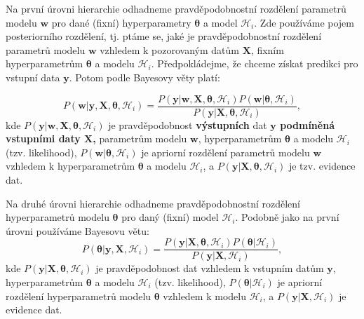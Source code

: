 Na první úrovni hierarchie odhadneme pravděpodobnostní rozdělení parametrů modelu $\mathbf{w}$ pro dané (fixní) hyperparametry $\boldsymbol{\theta}$ a model $\mathcal{H}_i$.
Zde používáme pojem posteriorního rozdělení, tj. ptáme se, jaké je pravděpodobnostní rozdělení parametrů modelu $\mathbf{w}$ vzhledem k pozorovaným datům $\mathbf{X}$, fixním hyperparametrům $\boldsymbol{\theta}$ a modelu $\mathcal{H}_i$.
Předpokládejme, že chceme získat predikci pro vstupní data $\mathbf{y}$.
Potom podle Bayesovy věty platí:

\begin{equation}
  P(\mathbf{w} | \mathbf{y}, \mathbf{X}, \boldsymbol{\theta}, \mathcal{H}_i) = \frac{P( \mathbf{y} | \mathbf{w}, \mathbf{X}, \boldsymbol{\theta}, \mathcal{H}_i) P(\mathbf{w} | \boldsymbol{\theta}, \mathcal{H}_i)}{P(\mathbf{y} |\mathbf{X}, \boldsymbol{\theta}, \mathcal{H}_i)},     
\end{equation}
kde $P( \mathbf{y} | \mathbf{w}, \mathbf{X}, \boldsymbol{\theta}, \mathcal{H}_i)$ je pravděpodobnost \textbf{výstupních} dat \textbf{$\mathbf{y}$ podmíněná vstupními daty $\mathbf{X}$,} parametrům modelu $\mathbf{w}$, hyperparametrům $\boldsymbol{\theta}$ a modelu $\mathcal{H}_i$ (tzv. likelihood), $P(\mathbf{w} | \boldsymbol{\theta}, \mathcal{H}_i)$ je apriorní rozdělení parametrů modelu $\mathbf{w}$ vzhledem k hyperparametrům $\boldsymbol{\theta}$ a modelu $\mathcal{H}_i$, a $P(\mathbf{y} |\mathbf{X}, \boldsymbol{\theta}, \mathcal{H}_i)$ je tzv. evidence dat.
\par

Na druhé úrovni hierarchie odhadneme pravděpodobnostní rozdělení hyperparametrů modelu $\boldsymbol{\theta}$ pro daný (fixní) model $\mathcal{H}_i$.
Podobně jako na první úrovni používáme Bayesovu větu:
\begin{equation}
  P(\boldsymbol{\theta} | \mathbf{y}, \mathbf{X}, \mathcal{H}_i) = \frac{P( \mathbf{y} | \mathbf{X}, \boldsymbol{\theta}, \mathcal{H}_i) P(\boldsymbol{\theta} | \mathcal{H}_i)}{P(\mathbf{y} |\mathbf{X}, \mathcal{H}_i)},     
  \label{eq:2_uroven}
\end{equation}
kde $P( \mathbf{y} | \mathbf{X}, \boldsymbol{\theta}, \mathcal{H}_i)$ je pravděpodobnost dat vzhledem k vstupním datům $\mathbf{y}$, hyperparametrům $\boldsymbol{\theta}$ a modelu $\mathcal{H}_i$ (tzv. likelihood), $P(\boldsymbol{\theta} | \mathcal{H}_i)$ je apriorní rozdělení hyperparametrů modelu $\boldsymbol{\theta}$
    vzhledem k modelu $\mathcal{H}_i$, a $P(\mathbf{y} |\mathbf{X}, \mathcal{H}_i)$ je evidence dat.   
\par


